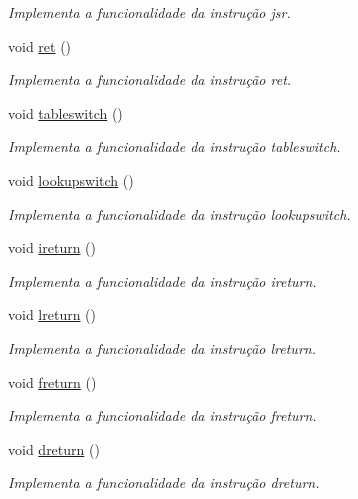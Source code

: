\begin{DoxyCompactItemize}
\begin{DoxyCompactList}\small\item\em Implementa a funcionalidade da instrução jsr. \end{DoxyCompactList}\item 
void \hyperlink{classOperations_a3e7225adafc030be5d6e1c2b0a963a9b}{ret} ()
\begin{DoxyCompactList}\small\item\em Implementa a funcionalidade da instrução ret. \end{DoxyCompactList}\item 
void \hyperlink{classOperations_a72955f43cde98b73c503e1a8c1505352}{tableswitch} ()
\begin{DoxyCompactList}\small\item\em Implementa a funcionalidade da instrução tableswitch. \end{DoxyCompactList}\item 
void \hyperlink{classOperations_a0458ee466daff63a3698973c89cfe71a}{lookupswitch} ()
\begin{DoxyCompactList}\small\item\em Implementa a funcionalidade da instrução lookupswitch. \end{DoxyCompactList}\item 
void \hyperlink{classOperations_a4be12fb7c8eeee8a2f6489ec27a46dce}{ireturn} ()
\begin{DoxyCompactList}\small\item\em Implementa a funcionalidade da instrução ireturn. \end{DoxyCompactList}\item 
void \hyperlink{classOperations_adbc4db2dbfcae7185bc9b7a005e988ea}{lreturn} ()
\begin{DoxyCompactList}\small\item\em Implementa a funcionalidade da instrução lreturn. \end{DoxyCompactList}\item 
void \hyperlink{classOperations_a701431fe6d5d20fafa747dbeae90e1d4}{freturn} ()
\begin{DoxyCompactList}\small\item\em Implementa a funcionalidade da instrução freturn. \end{DoxyCompactList}\item 
void \hyperlink{classOperations_a85ce8267820ffcc1e1530d533545c9f3}{dreturn} ()
\begin{DoxyCompactList}\small\item\em Implementa a funcionalidade da instrução dreturn. \end{DoxyCompactList}\item 

\end{DoxyCompactItemize}

